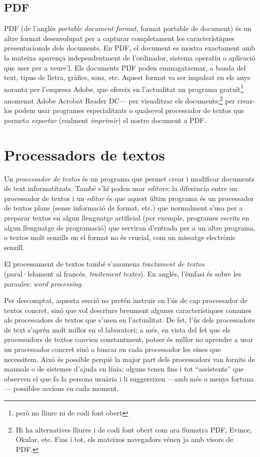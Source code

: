 \subsection{PDF}
PDF (de l'anglés \emph{portable document format}, format portable de
document) és un altre format desenvolupat per a capturar completament
les característiques presentacionals dels documents. En PDF, el
document es mostra exactament amb la mateixa aparença independentment
de l'ordinador, sistema operatiu o aplicació que user per
a veure'l. Els documents PDF poden emmagatzemar, a banda del text, tipus
de lletra, gràfics, sons, etc. Aquest format va ser impulsat en els
anys noranta per l'empresa Adobe, que ofereix en l'actualitat un
programa gratuït\footnote{però no lliure ni de codi font obert}
anomenat Adobe Acrobat Reader DC--- per visualitzar els
documents;\footnote{Hi ha alternatives lliures i de codi font obert
  com ara Sumatra PDF, Evince, Okular, etc. Fins i tot, els mateixos
  navegadors vénen ja amb visors de PDF.}  per crear-los podem usar
programes especialitzats o qualsevol processador de textos que permeta
\emph{exportar} (realment \emph{imprimir}) el nostre document a PDF.

\section{Processadors de textos}\label{ss:proctext}
Un \emph{processador de textos} és un programa que permet crear i
modificar documents de text informatitzats. També s'hi poden usar
\emph{editors}: la diferència entre un processador de textos i un
\emph{editor} és que aquest últim programa és un processador de textos
plans (sense informació de format, etc.) que normalment s'usa per a
preparar textos en algun llenguatge artificial (per exemple, programes
escrits en algun llenguatge de programació) que serviran d'entrada
per a un altre programa, o textos molt senzills on el format no és
crucial, com un missatge electrònic senzill.

El processament de textos també s'anomena \emph{tractament de textos}
(paral·lelament al francés, \emph{traitement textes}). En anglés,
l'èmfasi és sobre les paraules: \emph{word processing}.

Per descomptat, aquesta secció no pretén instruir en l'ús de cap
processador de textos concret, sinó que vol descriure breument algunes
característiques comunes als processadors de textos que s'usen en
l'actualitat. De fet, l'ús dels processadors de text s'aprén molt
millor en el laboratori; a més, en vista del fet que els processadors
de textos canvien constantment, potser és millor no aprendre a usar un
processador concret sinó a buscar en cada processador les eines que
necessitem. Això és possible perquè la major part dels processadors
van fornits de manuals o de sistemes d'ajuda en línia; alguns tenen
fins i tot ``assistents'' que observen el que fa la persona usuària i
li suggereixen ---amb més o menys fortuna--- possibles accions en cada
moment.

